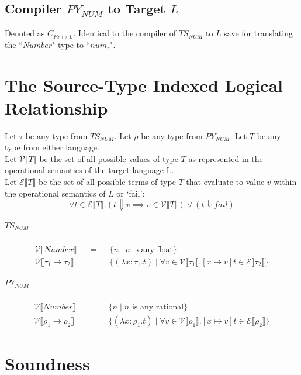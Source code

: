 \documentclass{article}
\newcommand{\makedenoteset}[3]{\mathcal{#1} \llbracket #2 \rrbracket && = && \{#3\}}
\newcommand{\denoteset}[2]{\mathcal{#1} \llbracket #2 \rrbracket}
\begin{document}
	\subsection{Compiler $PY_{NUM}$ to Target $L$}
		Denoted as $C_{PY \mapsto L}$. Identical to the compiler of $TS_{NUM}$ to $L$ save for translating the ``$Number$" type to ``$num_r$".

	\section{The Source-Type Indexed Logical Relationship}
	
	Let $\tau$ be any type from $TS_{NUM}$. Let $\rho$ be any type from $PY_{NUM}$. Let $T$ be any type from either language.\\
	
	Let $\denoteset{V}{T}$ be the set of all possible values of type $T$ as represented in the operational semantics of the target language L.\\
	
	Let $\denoteset{E}{T}$ be the set of all possible terms of type $T$ that evaluate to value $v$ within the operational semantics of $L$ or `fail':
	\[
		\forall t \in \denoteset{E}{T}. (t \Downarrow v \implies v \in \denoteset{V}{T}) \lor (t \Downarrow fail)
	\]

	
	\subparagraph{$TS_{NUM}$}
	\begin{align*}
		\makedenoteset{V}{Number}{n \mid n \text{ is any float}}\\
		\makedenoteset{V}{\tau_1 \rightarrow \tau_2}{
				(\lambda x\colon \tau_1.t)  \mid
				\forall v \in \denoteset{V}{\tau_1}.[x \mapsto v]t \in \denoteset{E}{\tau_2}
		}
	\end{align*}
	
	\subparagraph{$PY_{NUM}$}
	\begin{align*}
		\makedenoteset{V}{Number}{n \mid n \text{ is any rational}}\\
		\makedenoteset{V}{\rho_1 \rightarrow \rho_2}{
			(\lambda x: \rho_1.t) \mid
			\forall v \in \denoteset{V}{\rho_1}.[x \mapsto v]t \in \denoteset{E}{\rho_2}
		}
	\end{align*}
	
	\section{Soundness}
\end{document}
